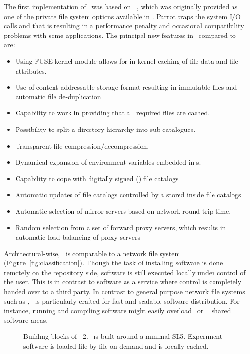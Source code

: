 The first implementation of \cvmfs\ was based on ~\cite{parrot, growfs09}, which was originally provided as one of the private file system options available in . 
Parrot traps the system I/O calls and that is resulting in a performance penalty and occasional compatibility problems with some applications. 
The principal new features in \cvmfs\ compared to  are:
\begin{itemize}
	\item Using FUSE kernel module allows for in-kernel caching of file data and file attributes.
	\item Use of content addressable storage format resulting in immutable files and automatic file de-duplication
	\item Capability to work in  providing that all required files are cached.
	\item Possibility to split a directory hierarchy into sub catalogues.
	\item Transparent file compression/decompression.
	\item Dynamical expansion of environment variables embedded in s.
	\item Capability to cope with digitally signed () file catalogs.
	\item Automatic updates of file catalogs controlled by a  stored inside file catalogs
	\item Automatic selection of mirror servers based on network round trip time.
	\item Random selection from a set of forward proxy servers, which results in automatic load-balancing of proxy servers
\end{itemize}

Architectural-wise, \cvmfs\ is comparable to a network file system (Figure~\ref{fig:classification}).
Though the task of installing software is done remotely on the repository side, software is still executed locally under control of the user.
This is in contrast to software as a service where control is completely handed over to a third party.
In contrast to general purpose network file systems such as \nfs, \cvmfs\ is particularly crafted for fast and scalable software distribution.
For instance, running and compiling software might easily overload \nfs\ or ~\cite{lustre03} shared software areas.

\begin{figure}
	\begin{center}
		\resizebox{\textwidth}{!}{}
	\end{center}
	\caption{Building blocks of \cernvm\ 2. \cernvm\ is built around a minimal SL5. Experiment software is loaded file by file on demand and is locally cached.}
	\label{fig:concept}
\end{figure}

